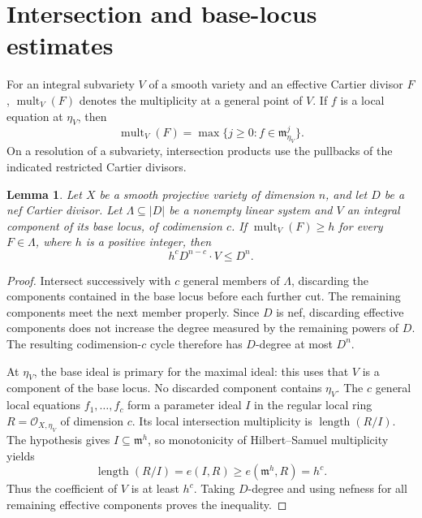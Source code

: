 \documentclass[12pt,a4paper,psamsfonts]{amsart}
\theoremstyle{definition}
\theoremstyle{plain}
\newtheorem{lemma}{Lemma}[section]
\newcommand{\mult}{\operatorname{mult}}
\begin{document}
\section{Intersection and base-locus estimates}

For an integral subvariety $V$ of a smooth variety and an effective
Cartier divisor $F$, $\mult_V(F)$ denotes the multiplicity at a
general point of $V$. If $f$ is a local equation at $\eta_V$, then
\[
 \mult_V(F)=\max\{j\ge0:f\in\mathfrak m_{\eta_V}^{j}\}.
\]
On a resolution of a subvariety, intersection products use the
pullbacks of the indicated restricted Cartier divisors.

\begin{lemma}\label{lem:hd-base-degree}
Let $X$ be a smooth projective variety of dimension $n$, and let
$D$ be a nef Cartier divisor. Let $\Lambda\subseteq|D|$ be a
nonempty linear system and $V$ an integral component of its base
locus, of codimension $c$. If $\mult_V(F)\ge h$ for every
$F\in\Lambda$, where $h$ is a positive integer, then
\[
 h^cD^{n-c}\cdot V\le D^n.
\]
\end{lemma}
\begin{proof}
Intersect successively with $c$ general members of $\Lambda$,
discarding the components contained in the base locus before
each further cut. The remaining components meet the next member
properly. Since $D$ is nef, discarding effective components does
not increase the degree measured by the remaining powers of $D$.
The resulting codimension-$c$ cycle therefore has $D$-degree at
most $D^n$.

At $\eta_V$, the base ideal is primary for the maximal ideal:
this uses that $V$ is a component of the base locus. No discarded
component contains $\eta_V$. The $c$ general local equations
$f_1,\ldots,f_c$ form a parameter ideal $I$ in the regular local
ring $R=\mathcal O_{X,\eta_V}$ of dimension $c$. Its local
intersection multiplicity is $\operatorname{length}(R/I)$.
The hypothesis gives $I\subseteq\mathfrak m^h$, so monotonicity
of Hilbert--Samuel multiplicity yields
\[
 \operatorname{length}(R/I)=e(I,R)
 \ge e(\mathfrak m^h,R)=h^c.
\]
Thus the coefficient of $V$ is at least $h^c$. Taking $D$-degree
and using nefness for all remaining effective components proves
the inequality.
\end{proof}
\end{document}
